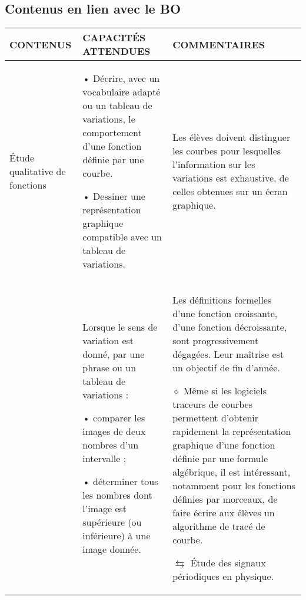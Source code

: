 \subsection{Contenus en lien avec le BO}

\begin{tabularx}{\textwidth}{|X|X|X|}
\hline 
CONTENUS & CAPACITÉS ATTENDUES & COMMENTAIRES \\ 
\hline
 
Étude qualitative de
fonctions 
& 
• Décrire, avec un vocabulaire
adapté ou un tableau de
variations, le comportement
d’une fonction définie par une
courbe.

• Dessiner une représentation
graphique compatible avec un
tableau de variations. 


& 
Les élèves doivent distinguer les
courbes pour lesquelles l’information
sur les variations est exhaustive, de
celles obtenues sur un écran graphique. \\ 

 & Lorsque le sens de variation
est donné, par une phrase ou
un tableau de variations :

• comparer les images de deux
nombres d’un intervalle ;

• déterminer tous les nombres
dont l’image est supérieure (ou
inférieure) à une image
donnée. & Les définitions formelles d’une fonction
croissante, d’une fonction décroissante,
sont progressivement dégagées. Leur
maîtrise est un objectif de fin d’année.

$\diamond$ Même si les logiciels traceurs de
courbes permettent d’obtenir rapidement
la représentation graphique d’une
fonction définie par une formule
algébrique, il est intéressant, notamment
pour les fonctions définies par
morceaux, de faire écrire aux élèves un
algorithme de tracé de courbe.

$\leftrightarrows$ Étude des signaux périodiques en
physique. \\ 
\hline 
\end{tabularx} 